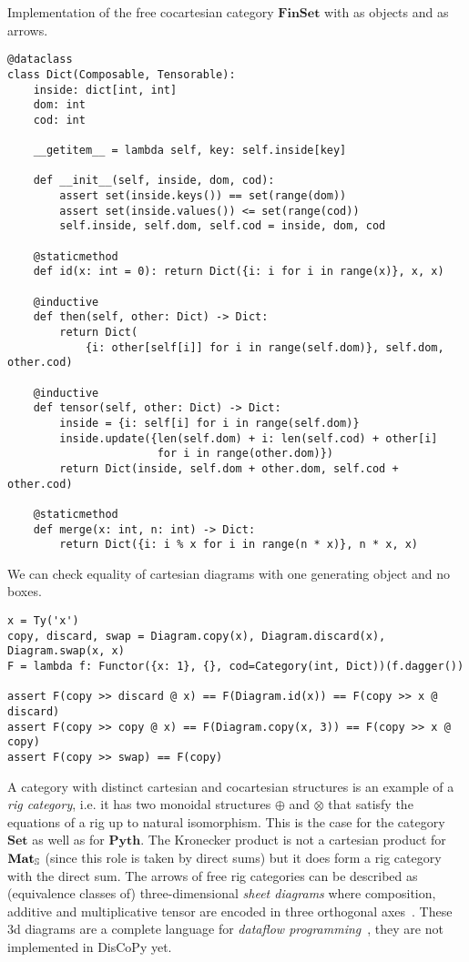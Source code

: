 \begin{python}
Implementation of the free cocartesian category $\mathbf{FinSet}$ with  as objects and  as arrows.

\begin{verbatim}
@dataclass
class Dict(Composable, Tensorable):
    inside: dict[int, int]
    dom: int
    cod: int

    __getitem__ = lambda self, key: self.inside[key]

    def __init__(self, inside, dom, cod):
        assert set(inside.keys()) == set(range(dom))
        assert set(inside.values()) <= set(range(cod))
        self.inside, self.dom, self.cod = inside, dom, cod

    @staticmethod
    def id(x: int = 0): return Dict({i: i for i in range(x)}, x, x)

    @inductive
    def then(self, other: Dict) -> Dict:
        return Dict(
            {i: other[self[i]] for i in range(self.dom)}, self.dom, other.cod)

    @inductive
    def tensor(self, other: Dict) -> Dict:
        inside = {i: self[i] for i in range(self.dom)}
        inside.update({len(self.dom) + i: len(self.cod) + other[i]
                       for i in range(other.dom)})
        return Dict(inside, self.dom + other.dom, self.cod + other.cod)

    @staticmethod
    def merge(x: int, n: int) -> Dict:
        return Dict({i: i % x for i in range(n * x)}, n * x, x)
\end{verbatim}
\end{python}

\begin{example}
We can check equality of cartesian diagrams with one generating object and no boxes.

\begin{verbatim}
x = Ty('x')
copy, discard, swap = Diagram.copy(x), Diagram.discard(x), Diagram.swap(x, x)
F = lambda f: Functor({x: 1}, {}, cod=Category(int, Dict))(f.dagger())

assert F(copy >> discard @ x) == F(Diagram.id(x)) == F(copy >> x @ discard)
assert F(copy >> copy @ x) == F(Diagram.copy(x, 3)) == F(copy >> x @ copy)
assert F(copy >> swap) == F(copy)
\end{verbatim}
\end{example}

A category with distinct cartesian and cocartesian structures is an example of a \emph{rig category}, i.e. it has two monoidal structures $\oplus$ and $\otimes$ that satisfy the equations of a rig up to natural isomorphism.
This is the case for the category $\mathbf{Set}$ as well as for $\mathbf{Pyth}$.
The Kronecker product is not a cartesian product for $\mathbf{Mat}_\S$ (since this role is taken by direct sums) but it does form a rig category with the direct sum.
The arrows of free rig categories can be described as (equivalence classes of) three-dimensional \emph{sheet diagrams} where composition, additive and multiplicative tensor are encoded in three orthogonal axes~\cite{ComfortEtAl20}.
These 3d diagrams are a complete language for \emph{dataflow programming}~\cite{Delpeuch20a}, they are not implemented in DisCoPy yet.

